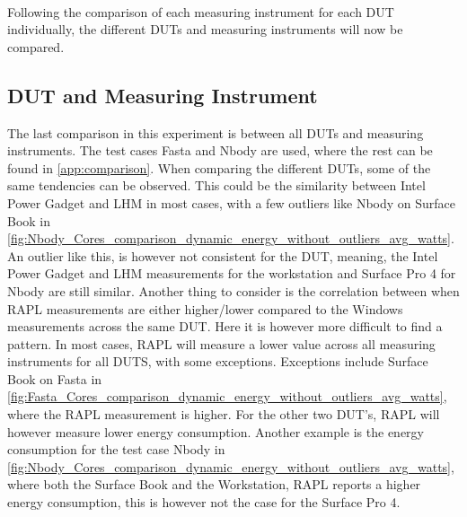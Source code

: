 \paragraph*{}
Following the comparison of each measuring instrument for each DUT individually, the different DUTs and measuring instruments will now be compared.

\subsection{DUT and Measuring Instrument}




The last comparison in this experiment is between all DUTs and measuring instruments. The test cases Fasta and Nbody are used, where the rest can be found in \cref{app:comparison}. When comparing the different DUTs, some of the same tendencies can be observed. This could be the similarity between Intel Power Gadget and LHM in most cases, with a few outliers like Nbody on Surface Book in \cref{fig:Nbody_Cores_comparison_dynamic_energy_without_outliers_avg_watts}. An outlier like this, is however not consistent for the DUT, meaning, the Intel Power Gadget and LHM measurements for the workstation and Surface Pro 4 for Nbody are still similar. Another thing to consider is the correlation between when RAPL measurements are either higher/lower compared to the Windows measurements across the same DUT. Here it is however more difficult to find a pattern. In most cases, RAPL will measure a lower value across all measuring instruments for all DUTS, with some exceptions. Exceptions include Surface Book on Fasta in \cref{fig:Fasta_Cores_comparison_dynamic_energy_without_outliers_avg_watts}, where the RAPL measurement is higher. For the other two DUT's, RAPL will however measure lower energy consumption. Another example is the energy consumption for the test case Nbody in \cref{fig:Nbody_Cores_comparison_dynamic_energy_without_outliers_avg_watts}, where both the Surface Book and the Workstation, RAPL reports a higher energy consumption, this is however not the case for the Surface Pro 4.

